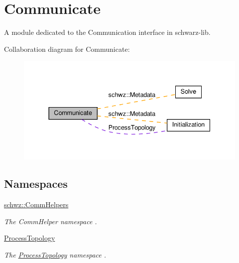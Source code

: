 \hypertarget{group__comm}{}\section{Communicate}
\label{group__comm}


A module dedicated to the Communication interface in schwarz-\/lib.  


Collaboration diagram for Communicate\+:
\nopagebreak
\begin{figure}[H]
\begin{center}
\leavevmode
\includegraphics[width=337pt]{group__comm}
\end{center}
\end{figure}
\subsection*{Namespaces}
\begin{DoxyCompactItemize}
\item 
 \hyperlink{namespaceschwz_1_1CommHelpers}{schwz\+::\+Comm\+Helpers}
\begin{DoxyCompactList}\small\item\em The Comm\+Helper namespace . \end{DoxyCompactList}\item 
 \hyperlink{namespaceProcessTopology}{Process\+Topology}
\begin{DoxyCompactList}\small\item\em The \hyperlink{namespaceProcessTopology}{Process\+Topology} namespace . \end{DoxyCompactList}\end{DoxyCompactItemize}
